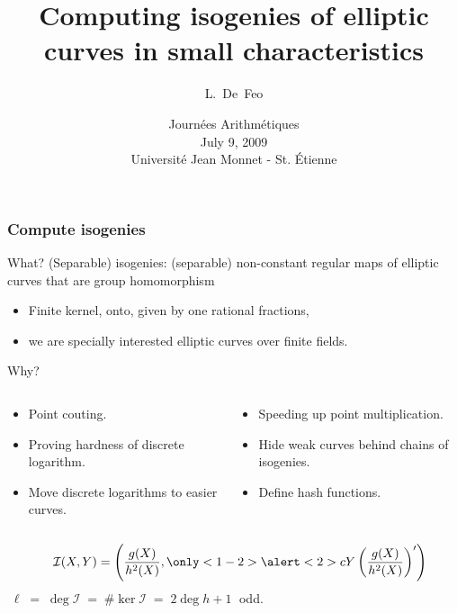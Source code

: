 \documentclass[10pt]{beamer}
\title[Computing isogenies in small characteristic]{Computing isogenies of elliptic curves in small characteristics}
\author[L.~De~Feo]{L.~De~Feo}
\institute[TANC, LIX]{Projet TANC, LIX, École Polytechnique, France}
\date[Journées Arithmétiques, July 9, 2009]{Journées Arithmétiques\\July 9, 2009\\Université Jean Monnet - St. Étienne}
\newcommand{\card}[1]{\# #1}  %
\newcommand{\0}{\mathcal{O}}  %
\newcommand{\isog}[1]{\mathcal{#1}}  %
\newcommand{\I}{\isog{I}}  %
\begin{document}
\begin{frame}
  \titlepage
\end{frame}


\begin{frame}
  \frametitle{Compute isogenies}

  \vspace{-2mm}

  \begin{block}{What?}
    \centering
    (Separable) isogenies: (separable) non-constant regular maps of
    elliptic curves that are group homomorphism
    
    \begin{itemize}
    \item Finite kernel, onto, given by one rational fractions,
    \item we are specially interested elliptic curves over finite fields.
    \end{itemize}
  \end{block}

  \vspace{-1mm}

  \begin{block}{Why?}
    \begin{columns}[T]
      \begin{column}{0.53\textwidth}
        \begin{itemize}
        \item Point couting.
        \item Proving hardness of discrete logarithm.
        \item Move discrete logarithms to easier curves.
        \end{itemize}
      \end{column}
      \begin{column}{0.46\textwidth}
        \begin{itemize}
        \item Speeding up point multiplication.
        \item Hide weak curves behind chains of isogenies.
        \item Define hash functions.
        \end{itemize}
      \end{column}
    \end{columns}
  \end{block}

  \vspace{-1.5mm}

  \begin{block}{}
    \[\quad\I(X,Y) = \left(\frac{g(X)}{h^2(X)},
    \only<1-2>{\alert<2>{c}}Y\left(\frac{g(X)}{h^2(X)}\right)'\right)\]
    $\;\ell\;=\;\deg\I\;=\;
    \card{\ker\I} \;=\; 2\deg h + 1\;$ odd.
  \end{block}
\end{frame}
\end{document}
